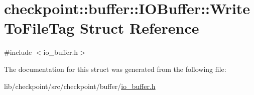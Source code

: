 \hypertarget{structcheckpoint_1_1buffer_1_1_i_o_buffer_1_1_write_to_file_tag}{}\section{checkpoint\+:\+:buffer\+:\+:I\+O\+Buffer\+:\+:Write\+To\+File\+Tag Struct Reference}
\label{structcheckpoint_1_1buffer_1_1_i_o_buffer_1_1_write_to_file_tag}


{\ttfamily \#include $<$io\+\_\+buffer.\+h$>$}



The documentation for this struct was generated from the following file\+:\begin{DoxyCompactItemize}
\item 
lib/checkpoint/src/checkpoint/buffer/\hyperlink{io__buffer_8h}{io\+\_\+buffer.\+h}\end{DoxyCompactItemize}

